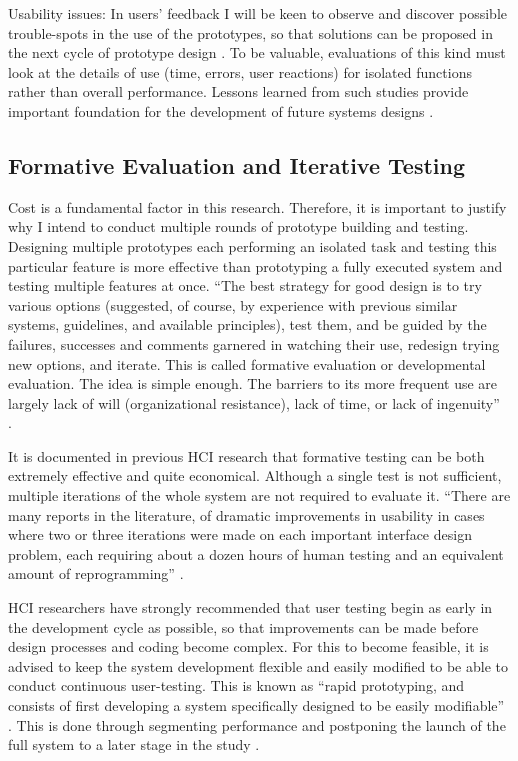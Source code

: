 Usability issues: In users’ feedback I will be keen to observe and discover possible trouble-spots in the use of the prototypes, so that solutions can be proposed in the next cycle of prototype design \parencite{Klasnja2011}. To be valuable, evaluations of this kind must look at the details of use (time, errors, user reactions) for isolated functions rather than overall performance. Lessons learned from such studies provide important foundation for the development of future systems designs \parencite{Cox2008}.

\subsection{Formative Evaluation and Iterative Testing}
\label{chap:iterativetesting}

Cost is a fundamental factor in this research. Therefore, it is important to justify why I intend to conduct multiple rounds of prototype building and testing. Designing multiple prototypes each performing an isolated task and testing this particular feature is more effective than prototyping a fully executed system and testing multiple features at once. ``The best strategy for good design is to try various options (suggested, of course, by experience with previous similar systems, guidelines, and available principles), test them, and be guided by the failures, successes and comments garnered in watching their use, redesign trying new options, and iterate. This is called formative evaluation or developmental evaluation. The idea is simple enough. The barriers to its more frequent use are largely lack of will (organizational resistance), lack of time, or lack of ingenuity'' \parencite{Dix2004}. 

It is documented in previous HCI research \parencite{Cox2008} \parencite{Lazar2010} that formative testing can be both extremely effective and quite economical. Although a single test is not sufficient, multiple iterations of the whole system are not required to evaluate it. ``There are many reports in the literature, of dramatic improvements in usability in cases where two or three iterations were made on each important interface design problem, each requiring about a dozen hours of human testing and an equivalent amount of reprogramming'' \parencite{Georges2004}.

HCI researchers \parencite{Cox2008} \parencite{Lazar2010} have strongly recommended that user testing begin as early in the development cycle as possible, so that improvements can be made before design processes and coding become complex. For this to become feasible, it is advised to keep the system development flexible and easily modified to be able to conduct continuous user-testing. This is known as ``rapid prototyping, and consists of first developing a system specifically designed to be easily modifiable'' \parencite{Wania2006}. This is done through segmenting performance and postponing the launch of the full system to a later stage in the study \parencite{Dix2004} \parencite{Georges2004}.

